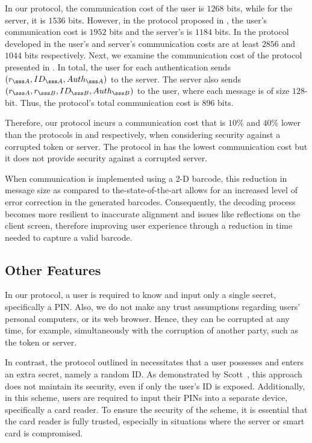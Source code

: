 In our protocol, the communication cost of the user is $1268$ bits, while for the server, it is $1536$ bits. However, in the protocol proposed in \cite{WangW18},  the user's communication cost is $1952$ bits and the server's is  $1184$ bits. In the protocol developed in \cite{JareckiJKSS21} the user's and server's communication costs are at least $2856$ and $1044$ bits respectively. Next, we examine the communication cost of the protocol presented in \cite{MatsuoMY11}. In total, the user for each authentication sends   $(r_{\sss A}, ID_{\sss A}, Auth_{\sss A})$ to the server. The server also sends $(r_{\sss A}, r_{\sss B}, ID_{\sss B}, Auth_{\sss B})$ to the user, where each message is of size $128$-bit. Thus, the protocol's total communication cost is $896$ bits. 


Therefore, our protocol incurs a communication cost that is $10\%$ and $40\%$ lower than the protocols in \cite{WangW18} and \cite{JareckiJKSS21} respectively, when considering security against a corrupted token or server. The protocol in \cite{MatsuoMY11} has the lowest communication cost but it does not provide security against a corrupted server. 

When communication is implemented using a 2-D barcode, this reduction in message size as compared to the-state-of-the-art allows for an increased level of error correction in the generated barcodes. Consequently, the decoding process becomes more resilient to inaccurate alignment and issues like reflections on the client screen, therefore improving user experience through a reduction in time needed to capture a valid barcode.


\vspace{-2mm}
\subsection{Other Features}
\vspace{-.3mm}

In our protocol, a user is required to know and input only a single secret, specifically a PIN. Also, we do not make any trust assumptions regarding users' personal computers, or its web browser. Hence, they can be corrupted at any time,  for example, simultaneously with the corruption of another party, such as the token or server. 
 
 In contrast, the protocol outlined in \cite{WangW18} necessitates that a user possesses and enters an extra secret, namely a random ID.  As demonstrated by Scott~\cite{Scott12a}, this approach does not maintain its security, even if only the user's ID is exposed. Additionally, in this scheme, users are required to input their PINs into a separate device, specifically a card reader. To ensure the security of the scheme, it is essential that the card reader is fully trusted, especially in situations where the server or smart card is compromised.
 

